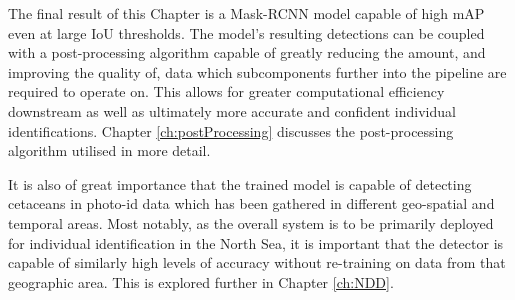 The final result of this Chapter is a Mask-RCNN model capable of high mAP even at large IoU thresholds. The model's resulting detections can be coupled with a post-processing algorithm capable of greatly reducing the amount, and improving the quality of, data which subcomponents further into the pipeline are required to operate on. This allows for greater computational efficiency downstream as well as ultimately more accurate and confident individual identifications. Chapter \ref{ch:postProcessing} discusses the post-processing algorithm utilised in more detail. 

It is also of great importance that the trained model is capable of detecting cetaceans in photo-id data which has been gathered in different geo-spatial and temporal areas. Most notably, as the overall system is to be primarily deployed for individual identification in the North Sea, it is important that the detector is capable of similarly high levels of accuracy without re-training on data from that geographic area. This is explored further in Chapter \ref{ch:NDD}.


